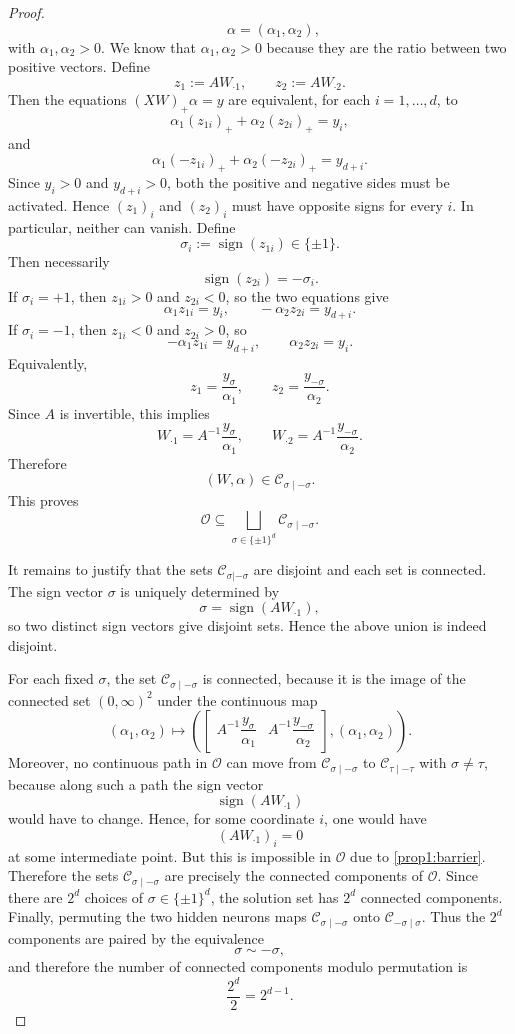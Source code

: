 \documentclass{article}
\begin{document}
\begin{proof}
\[\qquad
\alpha=(\alpha_1,\alpha_2),
\]
with $\alpha_1,\alpha_2>0$. We know that $\alpha_1, \alpha_2 > 0$ because they are the ratio between two positive vectors. Define
\[
z_1:=AW_{\cdot 1},\qquad z_2:=AW_{\cdot 2}.
\]
Then the equations $(XW)_+\alpha=y$ are equivalent, for each
$i=1,\dots,d$, to
\[
\alpha_1 (z_{1i})_+ + \alpha_2 (z_{2i})_{+} = y_i,
\]
and
\[
\alpha_1 (-z_{1i})_+ + \alpha_2 (-z_{2i})_+ = y_{d+i}.
\]
Since $y_i>0$ and $y_{d+i}>0$, both the positive and negative sides must be
activated. Hence $(z_1)_i$ and $(z_2)_i$ must have opposite signs for every
$i$. In particular, neither can vanish. Define
\[
\sigma_i:=\operatorname{sign}(z_{1i})\in\{\pm1\}.
\]
Then necessarily
\[
\operatorname{sign}(z_{2i})=-\sigma_i.
\]
If $\sigma_i=+1$, then $z_{1i}>0$ and $z_{2i}<0$, so the two equations give
\[
\alpha_1z_{1i}=y_i,
\qquad
-\alpha_2z_{2i}=y_{d+i}.
\]
If $\sigma_i=-1$, then $z_{1i}<0$ and $z_{2i}>0$, so
\[
-\alpha_1z_{1i}=y_{d+i},
\qquad
\alpha_2z_{2i}=y_i.
\]
Equivalently,
\[
z_1=\frac{y_\sigma}{\alpha_1},
\qquad
z_2=\frac{y_{-\sigma}}{\alpha_2}.
\]
Since $A$ is invertible, this implies
\[
W_{\cdot 1}=A^{-1}\frac{y_\sigma}{\alpha_1},
\qquad
W_{\cdot 2}=A^{-1}\frac{y_{-\sigma}}{\alpha_2}.
\]
Therefore
\[
(W,\alpha)\in \mathcal C_{\sigma\mid-\sigma}.
\]
This proves
\[
\mathcal{O} \subseteq
\bigsqcup_{\sigma\in\{\pm1\}^d}\mathcal C_{\sigma\mid-\sigma}.
\]

It remains to justify that the sets $\mathcal{C}_{\sigma | -\sigma}$ are disjoint and each set is connected. The sign vector $\sigma$ is uniquely determined by
\[
\sigma=\operatorname{sign}(AW_{\cdot 1}),
\]
so two distinct sign vectors give disjoint sets. Hence the above union is
indeed disjoint.

For each fixed $\sigma$, the set $\mathcal C_{\sigma\mid-\sigma}$ is connected,
because it is the image of the connected set $(0,\infty)^2$ under the continuous
map
\[
(\alpha_1,\alpha_2)\mapsto
\left(
\begin{bmatrix}
A^{-1}\dfrac{y_\sigma}{\alpha_1}
&
A^{-1}\dfrac{y_{-\sigma}}{\alpha_2}
\end{bmatrix},
(\alpha_1,\alpha_2)
\right).
\]
Moreover, no continuous path in $\mathcal O$ can move from
$\mathcal C_{\sigma\mid-\sigma}$ to
$\mathcal C_{\tau\mid-\tau}$ with $\sigma\neq\tau$, because along such a path
the sign vector
\[
\operatorname{sign}(AW_{\cdot 1})
\]
would have to change. Hence, for some coordinate $i$, one would have
\[
(AW_{\cdot 1})_i=0
\]
at some intermediate point. But this is impossible in $\mathcal O$ due to \cref{prop1:barrier}.
Therefore the sets $\mathcal C_{\sigma\mid-\sigma}$ are precisely the connected
components of $\mathcal O$. Since there are $2^d$ choices of
$\sigma\in\{\pm1\}^d$, the solution set has $2^d$ connected components.
Finally, permuting the two hidden neurons maps
$\mathcal C_{\sigma\mid-\sigma}$ onto
$\mathcal C_{-\sigma\mid\sigma}$.
Thus the $2^d$ components are paired by the equivalence
\[
\sigma\sim -\sigma,
\]
and therefore the number of connected components modulo permutation is
\[
\frac{2^d}{2}=2^{d-1}.
\]
\end{proof}
\end{document}
